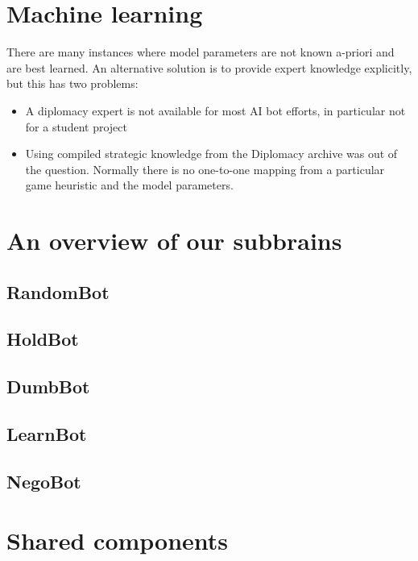 \documentclass[pdftex,12pt,a4paper]{report}
\begin{document}
\section{Machine learning}

There are many instances where model parameters are not known a-priori and
are best learned. An alternative solution is to provide expert knowledge 
explicitly, but this has two problems:

\begin{itemize}

\item A diplomacy expert is not available for most AI bot efforts, in 
      particular not for a student project

\item Using compiled strategic knowledge from the Diplomacy archive
      \cite{DipArchive04} was out of the question. Normally there
      is no one-to-one mapping from a particular game heuristic and
      the model parameters. 

\end{itemize}

\section{An overview of our subbrains}

\subsection{RandomBot}

\subsection{HoldBot}

\subsection{DumbBot}

\subsection{LearnBot}

\subsection{NegoBot}



\section{Shared components}
\end{document}
